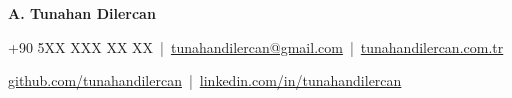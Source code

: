 \documentclass[11pt]{article}       %
\begin{document}
\centerline{\fontsize{24}{28}\selectfont \textbf{A. Tunahan Dilercan}}

\vspace{10pt}

{\small
\centerline{+90 5XX XXX XX XX \,|\, \href{mailto:tunahandilercan@gmail.com}{tunahandilercan@gmail.com} \,|\, \href{https://tunahandilercan.com.tr}{tunahandilercan.com.tr}}
\vspace{3pt}
\centerline{\href{https://github.com/tunahandilercan}{github.com/tunahandilercan} \,|\, \href{https://linkedin.com/in/tunahandilercan}{linkedin.com/in/tunahandilercan}}
}

\end{document}
